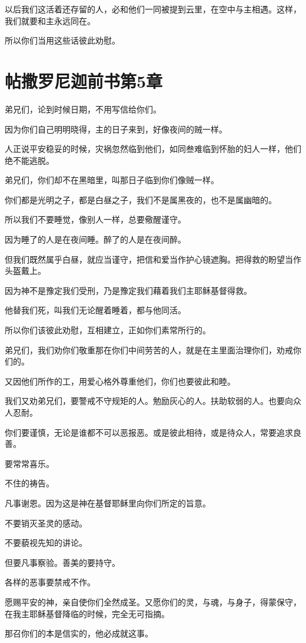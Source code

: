 \documentclass[12pt,oneside]{book}
\begin{document}
以后我们这活着还存留的人，必和他们一同被提到云里，在空中与主相遇。这样，我们就要和主永远同在。

所以你们当用这些话彼此劝慰。

\chapter{帖撒罗尼迦前书第5章}
弟兄们，论到时候日期，不用写信给你们。

因为你们自己明明晓得，主的日子来到，好像夜间的贼一样。

人正说平安稳妥的时候，灾祸忽然临到他们，如同叁难临到怀胎的妇人一样，他们绝不能逃脱。

弟兄们，你们却不在黑暗里，叫那日子临到你们像贼一样。

你们都是光明之子，都是白昼之子，我们不是属黑夜的，也不是属幽暗的。

所以我们不要睡觉，像别人一样，总要儆醒谨守。

因为睡了的人是在夜间睡。醉了的人是在夜间醉。

但我们既然属乎白昼，就应当谨守，把信和爱当作护心镜遮胸。把得救的盼望当作头盔戴上。

因为神不是豫定我们受刑，乃是豫定我们藉着我们主耶稣基督得救。

他替我们死，叫我们无论醒着睡着，都与他同活。

所以你们该彼此劝慰，互相建立，正如你们素常所行的。

弟兄们，我们劝你们敬重那在你们中间劳苦的人，就是在主里面治理你们，劝戒你们的。

又因他们所作的工，用爱心格外尊重他们，你们也要彼此和睦。

我们又劝弟兄们，要警戒不守规矩的人。勉励灰心的人。扶助软弱的人。也要向众人忍耐。

你们要谨慎，无论是谁都不可以恶报恶。或是彼此相待，或是待众人，常要追求良善。

要常常喜乐。

不住的祷告。

凡事谢恩。因为这是神在基督耶稣里向你们所定的旨意。

不要销灭圣灵的感动。

不要藐视先知的讲论。

但要凡事察验。善美的要持守。

各样的恶事要禁戒不作。

愿赐平安的神，亲自使你们全然成圣。又愿你们的灵，与魂，与身子，得蒙保守，在我主耶稣基督降临的时候，完全无可指摘。

那召你们的本是信实的，他必成就这事。
\end{document}
